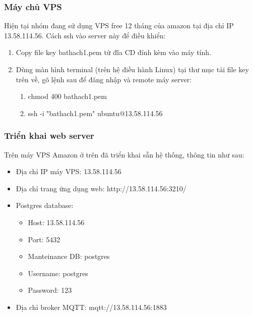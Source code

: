 \documentclass[a4paper,12pt,oneside]{article}
\begin{document}
\subsubsection{Máy chủ VPS}
\noindent Hiện tại nhóm đang sử dụng VPS free 12 tháng của amazon tại địa chỉ IP 13.58.114.56. Cách ssh vào server này để điều khiển:

\begin{enumerate}
\item Copy file key bathach1.pem từ đĩa CD đính kèm vào máy tính.
\item Dùng màn hình terminal (trên hệ điều hành Linux) tại thư mục tải file key trên về, gõ lệnh
sau để đăng nhập và remote máy server:
	\begin{enumerate}
	\item chmod 400 bathach1.pem
	\item ssh -i "bathach1.pem" ubuntu@13.58.114.56
	\end{enumerate}
\end{enumerate}
\subsubsection{Triển khai web server}

\noindent Trên máy VPS Amazon ở trên đã triển khai sẵn hệ thống, thông tin như sau:

\begin{itemize}
\item Địa chỉ IP máy VPS: 13.58.114.56
\item Địa chỉ trang ứng dụng web: http://13.58.114.56:3210/
\item Postgres database:
	\begin{itemize}
	\item Host: 13.58.114.56
	\item Port: 5432
	\item Manteinance DB: postgres
	\item Username: postgres
	\item Password: 123
	\end{itemize}
\item Địa chỉ broker MQTT: mqtt://13.58.114.56:1883
\end{itemize}
\end{document}
